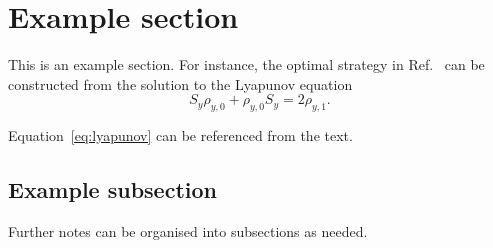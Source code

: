 \section{Example section}
\label{sec:example}

This is an example section. For instance, the optimal strategy in
Ref.~\cite{rubio2024first} can be constructed from the solution to the
Lyapunov equation
\begin{equation}
  S_{y}\rho_{y,0}
  + \rho_{y,0}S_{y}
  = 2\rho_{y,1}.
  \label{eq:lyapunov}
\end{equation}

Equation~\eqref{eq:lyapunov} can be referenced from the text.

\subsection{Example subsection}

Further notes can be organised into subsections as needed.